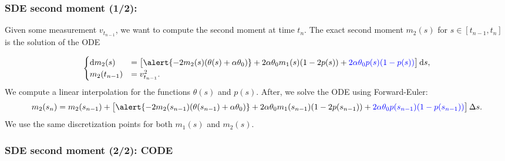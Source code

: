 \documentclass[aspectratio=169]{beamer}\usepackage[utf8]{inputenc}
\begin{document}
\begin{frame}\frametitle{SDE second moment (1/2):} \label{m2}

Given some measurement $v_{t_{n-1}}$, we want to compute the second moment at time $t_n$. The exact second moment $m_2(s)$ for $s\in[t_{n-1},t_n]$ is the solution of the ODE

\begin{equation*}
\begin{cases}
\dif m_2(s)&=\left[\alert{-2m_2(s)(\theta(s)+\alpha\theta_0)}+2\alpha\theta_0m_1(s)(1-2p(s))+{\color{blue}2\alpha\theta_0p(s)(1-p(s))}\right]\dif s,\\
m_2(t_{n-1})&=v^2_{t_{n-1}}.
\end{cases}
\end{equation*}
We compute a linear interpolation for the functions $\theta(s)$ and $p(s)$. After, we solve the ODE using Forward-Euler:
{\scriptsize
\begin{equation*}
m_2(s_n)=m_2(s_{n-1})+\left[\alert{-2m_2(s_{n-1})(\theta(s_{n-1})+\alpha\theta_0)}+2\alpha\theta_0m_1(s_{n-1})(1-2p(s_{n-1}))+{\color{blue}2\alpha\theta_0p(s_{n-1})(1-p(s_{n-1}))}\right]\Delta s.
\end{equation*}}
We use the same discretization points for both $m_1(s)$ and $m_2(s)$.

\end{frame}


\begin{frame}\frametitle{SDE second moment (2/2): CODE} \label{m2_code}

\begin{center}
\begin{tabular}{|c|}
\toprule
{\tiny

}\\
\bottomrule
\end{tabular}
\end{center}

\end{frame}
\end{document}
